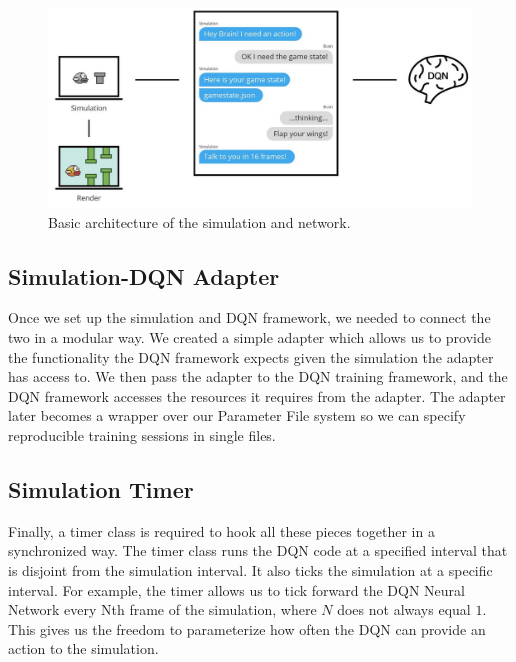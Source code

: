 \documentclass{chi2009}
\begin{document}
\begin{figure}[t]
\begin{center}
\includegraphics[width=\columnwidth]{figs/architecture.png}
\vspace*{-0.25in}
\caption{Basic architecture of the simulation and network.}
\label{fig:architecture}
\end{center}
\end{figure}

\subsection{Simulation-DQN Adapter}

Once we set up the simulation and DQN framework, we needed to connect the two in a modular way. We created a simple adapter which allows us to provide the functionality the DQN framework expects given the simulation the adapter has access to. We then pass the adapter to the DQN training framework, and the DQN framework accesses the resources it requires from the adapter. The adapter later becomes a wrapper over our Parameter File system so we can specify reproducible training sessions in single files.

\subsection{Simulation Timer}

Finally, a timer class is required to hook all these pieces together in a synchronized way. The timer class runs the DQN code at a specified interval that is disjoint from the simulation interval. It also ticks the simulation at a specific interval. For example, the timer allows us to tick forward the DQN Neural Network every Nth frame of the simulation, where $N$ does not always equal $1$. This gives us the freedom to parameterize how often the DQN can provide an action to the simulation.
\end{document}
